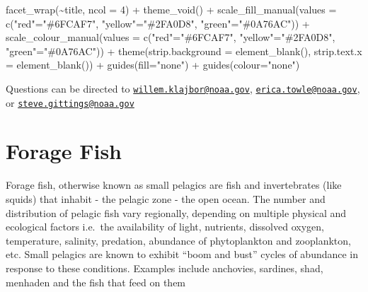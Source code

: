 \documentclass[
]{book}
\newenvironment{Shaded}{\begin{snugshade}}{\end{snugshade}}
\newcommand{\AttributeTok}[1]{\textcolor[rgb]{0.77,0.63,0.00}{#1}}
\newcommand{\DecValTok}[1]{\textcolor[rgb]{0.00,0.00,0.81}{#1}}
\newcommand{\FunctionTok}[1]{\textcolor[rgb]{0.00,0.00,0.00}{#1}}
\newcommand{\NormalTok}[1]{#1}
\newcommand{\OtherTok}[1]{\textcolor[rgb]{0.56,0.35,0.01}{#1}}
\newcommand{\SpecialCharTok}[1]{\textcolor[rgb]{0.00,0.00,0.00}{#1}}
\newcommand{\StringTok}[1]{\textcolor[rgb]{0.31,0.60,0.02}{#1}}
\begin{document}
\begin{Shaded}
\begin{Highlighting}[]
  \FunctionTok{facet\_wrap}\NormalTok{(}\SpecialCharTok{\textasciitilde{}}\NormalTok{title, }\AttributeTok{ncol =} \DecValTok{4}\NormalTok{) }\SpecialCharTok{+}
  \FunctionTok{theme\_void}\NormalTok{() }\SpecialCharTok{+}
  \FunctionTok{scale\_fill\_manual}\NormalTok{(}\AttributeTok{values =} \FunctionTok{c}\NormalTok{(}\StringTok{"red"}\OtherTok{=}\StringTok{"\#6FCAF7"}\NormalTok{, }\StringTok{"yellow"}\OtherTok{=}\StringTok{"\#2FA0D8"}\NormalTok{, }\StringTok{"green"}\OtherTok{=}\StringTok{"\#0A76AC"}\NormalTok{)) }\SpecialCharTok{+}
  \FunctionTok{scale\_colour\_manual}\NormalTok{(}\AttributeTok{values =} \FunctionTok{c}\NormalTok{(}\StringTok{"red"}\OtherTok{=}\StringTok{"\#6FCAF7"}\NormalTok{, }\StringTok{"yellow"}\OtherTok{=}\StringTok{"\#2FA0D8"}\NormalTok{, }\StringTok{"green"}\OtherTok{=}\StringTok{"\#0A76AC"}\NormalTok{)) }\SpecialCharTok{+}
  \FunctionTok{theme}\NormalTok{(}\AttributeTok{strip.background =} \FunctionTok{element\_blank}\NormalTok{(),}
        \AttributeTok{strip.text.x =} \FunctionTok{element\_blank}\NormalTok{()) }\SpecialCharTok{+}
  \FunctionTok{guides}\NormalTok{(}\AttributeTok{fill=}\StringTok{"none"}\NormalTok{) }\SpecialCharTok{+}
  \FunctionTok{guides}\NormalTok{(}\AttributeTok{colour=}\StringTok{"none"}\NormalTok{)}
\end{Highlighting}
\end{Shaded}

Questions can be directed to \href{mailto:willem.klajbor@noaa.gov}{\nolinkurl{willem.klajbor@noaa.gov}}, \href{mailto:erica.towle@noaa.gov}{\nolinkurl{erica.towle@noaa.gov}}, or \href{mailto:steve.gittings@noaa.gov}{\nolinkurl{steve.gittings@noaa.gov}}

\hypertarget{forage-fish}{%
\chapter{Forage Fish}\label{forage-fish}}

Forage fish, otherwise known as small pelagics are fish and invertebrates (like squids) that inhabit - the pelagic zone - the open ocean. The number and distribution of pelagic fish vary regionally, depending on multiple physical and ecological factors i.e.~the availability of light, nutrients, dissolved oxygen, temperature, salinity, predation, abundance of phytoplankton and zooplankton, etc. Small pelagics are known to exhibit ``boom and bust'' cycles of abundance in response to these conditions. Examples include anchovies, sardines, shad, menhaden and the fish that feed on them
\end{document}
